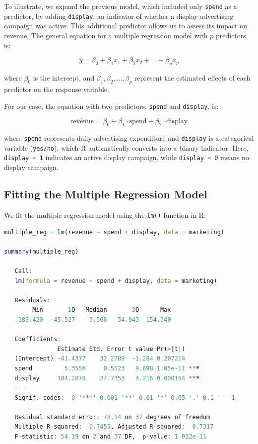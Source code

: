 \documentclass[
  11pt,
]{book}
\newcommand{\passthrough}[1]{#1}
\theoremstyle{definition}
\theoremstyle{definition}
\theoremstyle{definition}
\theoremstyle{definition}
\theoremstyle{remark}
\begin{document}
To illustrate, we expand the previous model, which included only \passthrough{\lstinline!spend!} as a predictor, by adding \passthrough{\lstinline!display!}, an indicator of whether a display advertising campaign was active. This additional predictor allows us to assess its impact on revenue. The general equation for a multiple regression model with \(p\) predictors is:

\[
\hat{y} = \beta_0 + \beta_1 x_1 + \beta_2 x_2 + \dots + \beta_p x_p
\]

where \(\beta_0\) is the intercept, and \(\beta_1, \beta_2, \dots, \beta_p\) represent the estimated effects of each predictor on the response variable.

For our case, the equation with two predictors, \passthrough{\lstinline!spend!} and \passthrough{\lstinline!display!}, is:

\[
\hat{\text{revenue}} = \beta_0 + \beta_1 \cdot \text{spend} + \beta_2 \cdot \text{display}
\]

where \passthrough{\lstinline!spend!} represents daily advertising expenditure and \passthrough{\lstinline!display!} is a categorical variable (\passthrough{\lstinline!yes/no!}), which R automatically converts into a binary indicator. Here, \passthrough{\lstinline!display = 1!} indicates an active display campaign, while \passthrough{\lstinline!display = 0!} means no display campaign.

\subsection*{Fitting the Multiple Regression Model}\label{fitting-the-multiple-regression-model}


We fit the multiple regression model using the \passthrough{\lstinline!lm()!} function in R:

\begin{lstlisting}[language=R]
multiple_reg = lm(revenue ~ spend + display, data = marketing)

summary(multiple_reg)
   
   Call:
   lm(formula = revenue ~ spend + display, data = marketing)
   
   Residuals:
        Min       1Q   Median       3Q      Max 
   -189.420  -45.527    5.566   54.943  154.340 
   
   Coefficients:
               Estimate Std. Error t value Pr(>|t|)    
   (Intercept) -41.4377    32.2789  -1.284 0.207214    
   spend         5.3556     0.5523   9.698 1.05e-11 ***
   display     104.2878    24.7353   4.216 0.000154 ***
   ---
   Signif. codes:  0 '***' 0.001 '**' 0.01 '*' 0.05 '.' 0.1 ' ' 1
   
   Residual standard error: 78.14 on 37 degrees of freedom
   Multiple R-squared:  0.7455, Adjusted R-squared:  0.7317 
   F-statistic: 54.19 on 2 and 37 DF,  p-value: 1.012e-11
\end{lstlisting}
\end{document}
